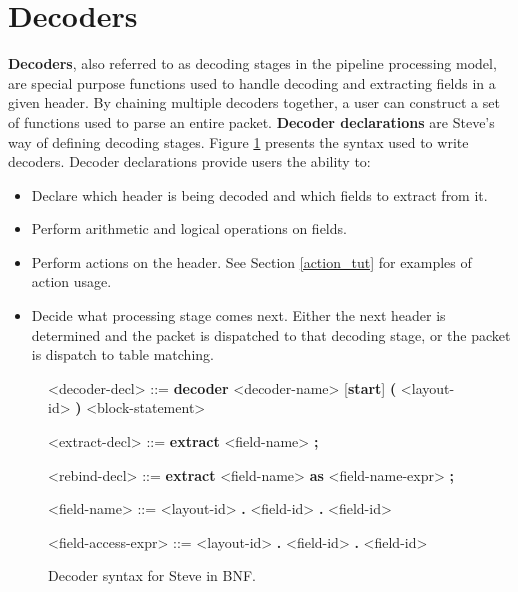\section{Decoders} \label{decoder_tut}

\textbf{Decoders}, also referred to as decoding stages in the pipeline processing model,  are special purpose functions used to handle decoding and extracting fields in a given header. By chaining multiple decoders together, a user can construct a set of functions used to parse an entire packet. \textbf{Decoder declarations} are Steve's way of defining decoding stages. Figure \ref{fg:decoder_syntax} presents the syntax used to write decoders. Decoder declarations provide users the ability to:

\begin{itemize}
\item Declare which header is being decoded and which fields to extract from it.
\item Perform arithmetic and logical operations on fields.
\item Perform actions on the header. See Section \ref{action_tut} for examples of action usage.
\item Decide what processing stage comes next. Either the next header is determined and the packet is dispatched to that decoding stage, or the packet is dispatch to table matching.
\end{itemize}

\begin{figure}
\begin{mdframed}
\begin{grammar}

<decoder-decl> ::=
\textbf{decoder} <decoder-name> [\textbf{start}] 
\textbf{(} <layout-id> \textbf{)}
<block-statement>

<extract-decl> ::=
\textbf{extract} <field-name> \textbf{;}

<rebind-decl> ::=
\textbf{extract} <field-name> \textbf{as} <field-name-expr> \textbf{;}

<field-name> ::=
<layout-id> \textbf{.} <field-id>
 \textbf{.} <field-id>

<field-access-expr> ::=
<layout-id> \textbf{.} <field-id>
 \textbf{.} <field-id>

\end{grammar}
\end{mdframed}
\caption{Decoder syntax for Steve in BNF.}
\label{fg:decoder_syntax}
\end{figure}

